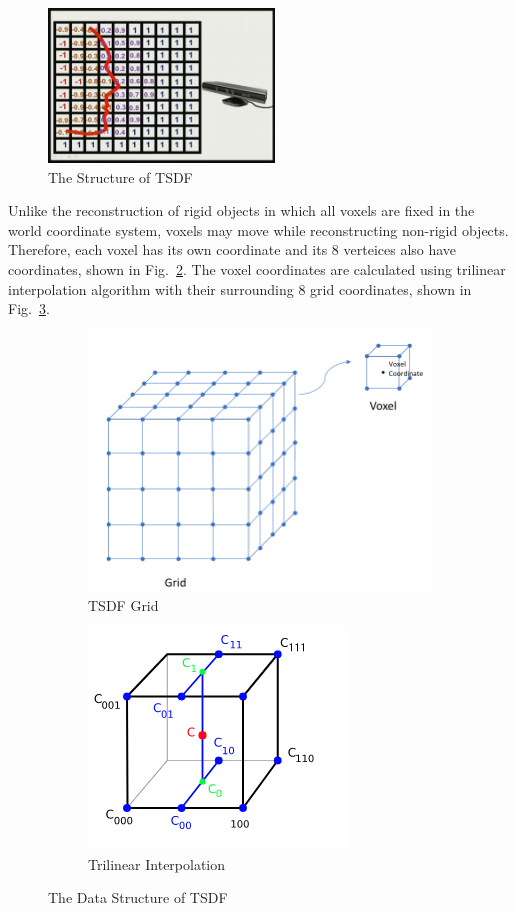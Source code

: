 \documentclass{article}
\begin{document}
\begin{figure}[htp]
\centering
\includegraphics[width=6cm]{figures/tsdf.jpg}
\caption{The Structure of TSDF}
\label{fig:TSDF}
\end{figure}

Unlike the reconstruction of rigid objects in which all voxels are fixed in the world coordinate system, voxels may move while reconstructing non-rigid objects. Therefore, each voxel has its own coordinate and its 8 verteices also have coordinates, shown in Fig.~\ref{fig:sub1}. The voxel coordinates are calculated using trilinear interpolation algorithm with their surrounding 8 grid coordinates, shown in Fig.~\ref{fig:sub2}.

\begin{figure}
\centering
\begin{subfigure}{.65\textwidth}
  \centering
  \includegraphics[width=.65\linewidth]{figures/DataStruct.png}
  \caption{TSDF Grid}
  \label{fig:sub1}
\end{subfigure}%
\begin{subfigure}{.35\textwidth}
  \centering
  \includegraphics[width=.35\linewidth]{figures/3D_interpolation.png}
  \caption{Trilinear Interpolation}
  \label{fig:sub2}
\end{subfigure}
\caption{The Data Structure of TSDF}
\label{fig:test}
\end{figure}
\end{document}
